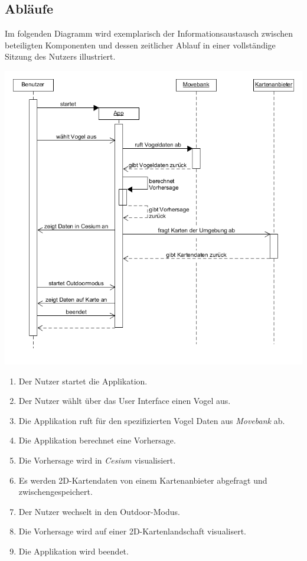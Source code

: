 \documentclass[12pt]{article} %
\newenvironment{cptenumerate}[1][label=\arabic*.]{\begin{enumerate}[#1] \setlength\itemsep{0em}}{\end{enumerate}}
\begin{document}
\subsection{Abläufe}

Im folgenden Diagramm wird exemplarisch der Informationsaustausch zwischen beteiligten Komponenten und dessen zeitlicher Ablauf in einer vollständige Sitzung des Nutzers illustriert. 

\includegraphics[width = 1\linewidth]{Sequenzdiagramm.png}

\begin{cptenumerate} 
 	 \item Der Nutzer startet die Applikation.
 	 \item Der Nutzer wählt über das User Interface einen Vogel aus.
 	 \item Die Applikation ruft für den spezifizierten Vogel Daten aus \textit{Movebank} ab.
 	 \item Die Applikation berechnet eine Vorhersage.
 	 \item Die Vorhersage wird in \textit{Cesium} visualisiert.
 	 \item Es werden 2D-Kartendaten von einem Kartenanbieter abgefragt und zwischengespeichert.
 	 \item Der Nutzer wechselt in den Outdoor-Modus.
 	 \item Die Vorhersage wird auf einer 2D-Kartenlandschaft visualisert.
 	 \item Die Applikation wird beendet.
\end{cptenumerate} 
\end{document}
